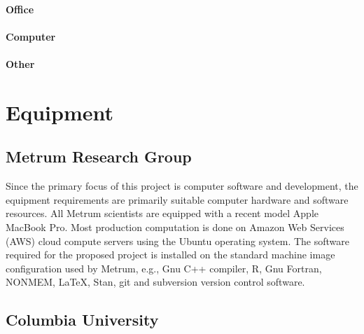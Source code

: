 \documentclass[11pt]{article}
\newcommand{\instructions}[1]{}
\begin{document}
\instructions{ Review criteria: Will the scientific environment in
    which the work will be done contribute to the probability of
    success? Are the institutional support, equipment and other
    physical resources available to the investigators adequate for the
    project proposed? Will the project benefit from unique features of
    the scientific environment, subject populations, or collaborative
    arrangements?}

\paragraph{Office}

\paragraph{Computer}

\paragraph{Other}

\clearpage
\section*{Equipment}

\subsection*{Metrum Research Group}

Since the primary focus of this project is computer software and
development, the equipment requirements are primarily suitable
computer hardware and software resources. All Metrum scientists are
equipped with a recent model Apple MacBook Pro. Most production
computation is done on Amazon Web Services (AWS) cloud compute servers
using the Ubuntu operating system. The software required for the
proposed project is installed on the standard machine image
configuration used by Metrum, e.g., Gnu C++ compiler, R, Gnu Fortran,
NONMEM, LaTeX, Stan, git and subversion version control software.

\subsection*{Columbia University}
\end{document}
